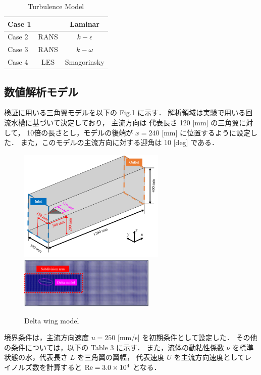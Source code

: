 \documentclass[twocolumn,a4j]{jsarticle}
\begin{document}
\begin{table}[hbtp]
	\centering
	\caption{Turbulence Model}
	\begin{tabular}{l c c}
		\hline
		Case 1 &      & Laminar      \\ \hline
		Case 2 & RANS & $k-\epsilon$ \\ \hline
		Case 3 & RANS & $k-\omega$   \\ \hline
		Case 4 & LES  & Smagorinsky  \\ \hline
	\end{tabular}
\end{table}

\newpage
\subsection{数値解析モデル}
検証に用いる三角翼モデルを以下の Fig.1 に示す．
解析領域は実験で用いる回流水槽に基づいて決定しており，
主流方向は 代表長さ 120 [mm] の三角翼に対して，
10倍の長さとし，モデルの後端が $x=240$ [mm] に位置するように設定した．
また，このモデルの主流方向に対する迎角は 10 [deg] である．
\begin{figure}[htbp]
	\centering
	{
		\includegraphics[keepaspectratio, width=70mm]{../images/Simulation/0_Mesh/Model_Birdseyeview.png}
		\includegraphics[keepaspectratio, width=65mm]{../images/Simulation/0_Mesh/Mesh_Sideview.png}
	}
	\caption{Delta wing model}
\end{figure}

境界条件は，主流方向速度 $u = 250$ [mm/s] を初期条件として設定した．
その他の条件については，以下の Table 3 に示す．
また，流体の動粘性係数 $\nu$ を標準状態の水，代表長さ $L$ を三角翼の翼幅，
代表速度 $U$ を主流方向速度としてレイノルズ数を計算すると
$\rm{Re} = 3.0 \times 10^{4}$ となる．
\end{document}
